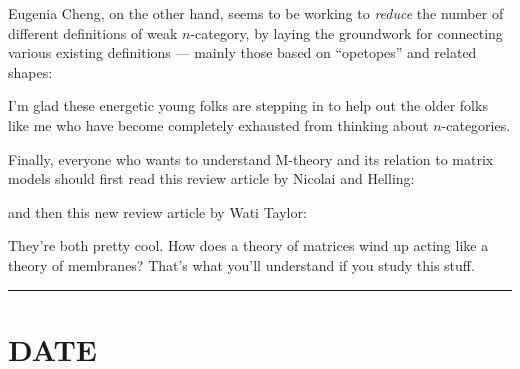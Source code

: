 \documentclass{article}
\def\tightlist{}
\renewcommand{\texttt}[1]{%
  \begingroup
  \ttfamily
  \begingroup\lccode`~=`/\lowercase{\endgroup\def~}{/\discretionary{}{}{}}%
  \begingroup\lccode`~=`[\lowercase{\endgroup\def~}{[\discretionary{}{}{}}%
  \begingroup\lccode`~=`.\lowercase{\endgroup\def~}{.\discretionary{}{}{}}%
  \catcode`/=\active\catcode`[=\active\catcode`.=\active
  \scantokens{#1\noexpand}%
  \endgroup
}
\begin{document}
Eugenia Cheng, on the other hand, seems to be working to \emph{reduce}
the number of different definitions of weak \(n\)-category, by laying
the groundwork for connecting various existing definitions --- mainly
those based on ``opetopes'' and related shapes:


I'm glad these energetic young folks are stepping in to help out the
older folks like me who have become completely exhausted from thinking
about \(n\)-categories.

Finally, everyone who wants to understand M-theory and its relation to
matrix models should first read this review article by Nicolai and
Helling:


and then this new review article by Wati Taylor:


They're both pretty cool. How does a theory of matrices wind up acting
like a theory of membranes? That's what you'll understand if you study
this stuff.

\begin{center}\rule{0.5\linewidth}{0.5pt}\end{center}
\hypertarget{week166}{%
\section{DATE}\label{week166}}
\end{document}
